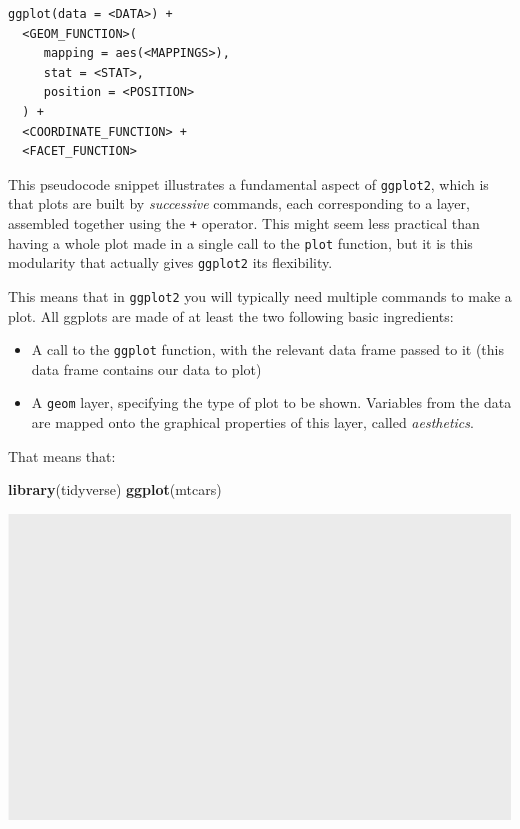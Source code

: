 \documentclass[]{book}
\newenvironment{Shaded}{}{}
\newcommand{\KeywordTok}[1]{\textcolor[rgb]{0.00,0.44,0.13}{\textbf{#1}}}
\newcommand{\NormalTok}[1]{#1}
\providecommand{\tightlist}{%
  \setlength{\itemsep}{0pt}\setlength{\parskip}{0pt}}
\begin{document}
\begin{verbatim}
ggplot(data = <DATA>) + 
  <GEOM_FUNCTION>(
     mapping = aes(<MAPPINGS>),
     stat = <STAT>, 
     position = <POSITION>
  ) +
  <COORDINATE_FUNCTION> +
  <FACET_FUNCTION>
\end{verbatim}

This pseudocode snippet illustrates a fundamental aspect of \texttt{ggplot2}, which is that plots are built by \emph{successive} commands, each corresponding to a layer, assembled together using the \texttt{+} operator. This might seem less practical than having a whole plot made in a single call to the \texttt{plot} function, but it is this modularity that actually gives \texttt{ggplot2} its flexibility.

This means that in \texttt{ggplot2} you will typically need multiple commands to make a plot. All ggplots are made of at least the two following basic ingredients:

\begin{itemize}
\tightlist
\item
  A call to the \texttt{ggplot} function, with the relevant data frame passed to it (this data frame contains our data to plot)
\item
  A \texttt{geom} layer, specifying the type of plot to be shown. Variables from the data are mapped onto the graphical properties of this layer, called \emph{aesthetics}.
\end{itemize}

That means that:

\begin{Shaded}
\begin{Highlighting}[]
\KeywordTok{library}\NormalTok{(tidyverse)}
\KeywordTok{ggplot}\NormalTok{(mtcars)}
\end{Highlighting}
\end{Shaded}

\begin{center}\includegraphics[width=\textwidth]{TRES-Tidy-Tutorial_files/figure-latex/unnamed-chunk-106-1} \end{center}
\end{document}
